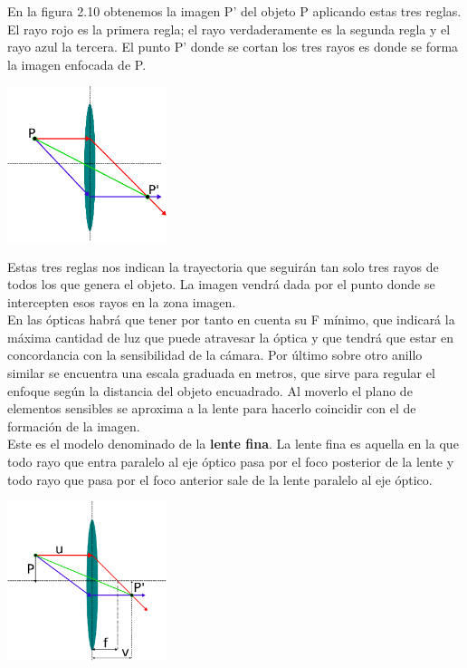 En la figura 2.10 obtenemos la imagen P' del objeto P aplicando estas tres reglas. El rayo rojo es la primera regla;
el rayo verdaderamente es la segunda regla y el rayo azul la tercera. El punto P' donde se cortan los tres rayos es donde se forma la
imagen enfocada de P.
\begin{center}
	\includegraphics[width=0.35\textwidth]{Contenido/Cuerpo/Capitulo2/Fig1_10.eps}
	\label{fig:MarcoTeorico:Fig10}
\end{center}
Estas tres reglas nos indican la trayectoria que seguirán tan solo tres rayos de todos los que genera el objeto. La imagen vendrá
dada por el punto donde se intercepten esos rayos en la zona imagen.\\
En las ópticas habrá que tener por
tanto en cuenta su F mínimo, que indicará la máxima cantidad de luz que puede
atravesar la óptica y que tendrá que estar en concordancia con la sensibilidad de la
cámara. Por último sobre otro anillo similar se encuentra una escala graduada en metros,
que sirve para regular el enfoque según la distancia del objeto encuadrado. Al moverlo
el plano de elementos sensibles se aproxima a la lente para hacerlo coincidir con el de
formación de la imagen.\\
Este es el modelo denominado de la \textbf{lente fina}. La
lente fina es aquella en la que todo rayo que entra paralelo al eje óptico pasa por el foco
posterior de la lente y todo rayo que pasa por el foco anterior sale de la lente paralelo al
eje óptico.
\begin{center}
	\includegraphics[width=0.35\textwidth]{Contenido/Cuerpo/Capitulo2/Fig1_11.eps}
	\label{fig:MarcoTeorico:Fig11}
\end{center}

